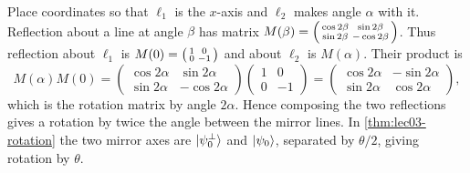 \begin{solution}
Place coordinates so that $\ell_1$ is the $x$-axis and $\ell_2$ makes angle $\alpha$
with it. Reflection about a line at angle $\beta$ has matrix
$M(\beta)=\begin{psmallmatrix}\cos2\beta&\sin2\beta\\\sin2\beta&-\cos2\beta\end{psmallmatrix}$.
Thus reflection about $\ell_1$ is
$M(0)=\begin{psmallmatrix}1&0\\0&-1\end{psmallmatrix}$ and about $\ell_2$ is
$M(\alpha)$. Their product is
\[
  M(\alpha)M(0)
   =\begin{pmatrix}\cos2\alpha&\sin2\alpha\\ \sin2\alpha&-\cos2\alpha\end{pmatrix}
    \begin{pmatrix}1&0\\0&-1\end{pmatrix}
   =\begin{pmatrix}\cos2\alpha&-\sin2\alpha\\ \sin2\alpha&\cos2\alpha\end{pmatrix},
\]
which is the rotation matrix by angle $2\alpha$. Hence composing the two reflections
gives a rotation by twice the angle between the mirror lines. In
\cref{thm:lec03-rotation} the two mirror axes are $\ket{\psi_0^{\perp}}$ and
$\ket{\psi_0}$, separated by $\theta/2$, giving rotation by $\theta$.
\end{solution}

